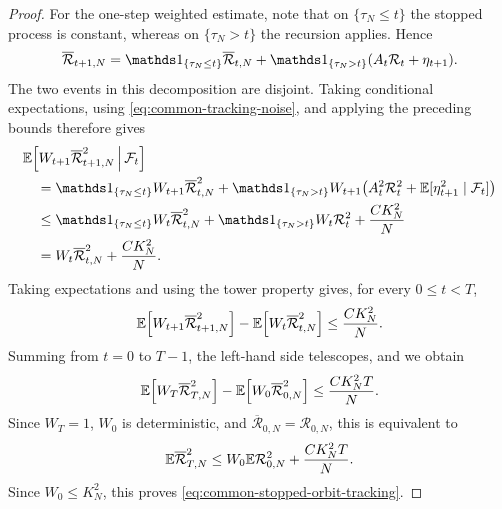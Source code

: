 \documentclass[11pt,reqno,a4paper]{article}
\newcommand{\Ee}{\E}
\begin{document}
\begin{proof}
  For the one-step weighted estimate, note that on
  $\{\tau_N\leq t\}$ the stopped process is constant, whereas on
  $\{\tau_N>t\}$ the recursion applies. Hence
  \begin{equation*}
    \overline{\mathcal R}_{t+1,N}
    =
    \one_{\{\tau_N\leq t\}}\overline{\mathcal R}_{t,N}
    +
    \one_{\{\tau_N>t\}}(A_t\mathcal R_t+\eta_{t+1}).
  \end{equation*}
  The two events in this decomposition are disjoint. Taking conditional
  expectations, using \cref{eq:common-tracking-noise}, and applying the
  preceding bounds therefore gives
  \begin{align*}
    &\Ee\left[
      W_{t+1}\overline{\mathcal R}_{t+1,N}^2
      \,\middle|\,\mathcal F_t
    \right]
    \\
    &\quad=
    \one_{\{\tau_N\leq t\}}W_{t+1}
      \overline{\mathcal R}_{t,N}^2
    +
    \one_{\{\tau_N>t\}}W_{t+1}
      \left(A_t^2\mathcal R_t^2
      +\Ee[\eta_{t+1}^2\mid\mathcal F_t]\right)
    \\
    &\quad\leq
    \one_{\{\tau_N\leq t\}}W_t
      \overline{\mathcal R}_{t,N}^2
    +
    \one_{\{\tau_N>t\}}W_t\mathcal R_t^2
    +\frac{CK_N^2}{N}
    \\
    &\quad=
    W_t\overline{\mathcal R}_{t,N}^2
    +\frac{CK_N^2}{N}.
  \end{align*}
  Taking expectations and using the tower property gives, for every
  $0\leq t<T$,
  \begin{equation*}
    \Ee\left[W_{t+1}\overline{\mathcal R}_{t+1,N}^2\right]
    -\Ee\left[W_t\overline{\mathcal R}_{t,N}^2\right]
    \leq
    \frac{CK_N^2}{N}.
  \end{equation*}
  Summing from $t=0$ to $T-1$, the left-hand side telescopes, and we obtain
  \begin{equation*}
    \Ee\left[W_T\overline{\mathcal R}_{T,N}^2\right]
    -\Ee\left[W_0\overline{\mathcal R}_{0,N}^2\right]
    \leq
    \frac{CK_N^2T}{N}.
  \end{equation*}
  Since $W_T=1$, $W_0$ is deterministic, and
  $\overline{\mathcal R}_{0,N}=\mathcal R_{0,N}$, this is equivalent to
  \begin{equation*}
    \Ee\overline{\mathcal R}_{T,N}^2
    \leq
    W_0\Ee\mathcal R_{0,N}^2+\frac{CK_N^2T}{N}.
  \end{equation*}
  Since $W_0\leq K_N^2$, this proves
  \cref{eq:common-stopped-orbit-tracking}.


\end{proof}
\end{document}

